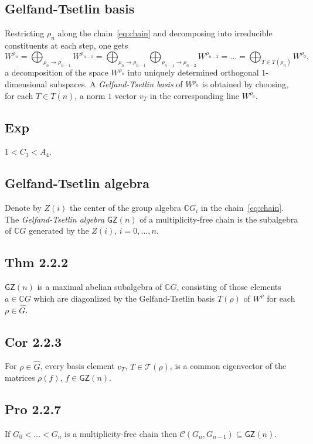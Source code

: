 \documentclass[a4paper]{amsart}
\newcommand{\C}{\mathbb{C}}
\newcommand{\CC}{\mathcal{C}}
\newcommand{\TT}{\mathcal{T}}
\newcommand{\GZ}{\mathsf{GZ}}
\begin{document}
\subsection{Gelfand-Tsetlin basis}

Restricting $\rho_n$ along the chain~\eqref{eq:chain} and decomposing into irreducible
constituents at each step, one gets
\[
W^{\rho_n} = \bigoplus_{\rho_n\to \rho_{n-1}} W^{\rho_{n-1}}
= \bigoplus_{\rho_n\to \rho_{n-1}} \bigoplus_{\rho_{n-1} \to \rho_{n-2}} W^{\rho_{n-2}}
= \dots
= \bigoplus_{T\in T(\rho_n)} W^{\rho_0},
\]
a decomposition of the space $W^{\rho_n}$ into uniquely determined
orthogonal $1$-dimensional subspaces.  A \emph{Gelfand-Tsetlin basis}
of $W^{\rho_n}$ is obtained by choosing, for each $T \in T(n)$, a norm
$1$ vector $v_T$ in the corresponding line $W^{\rho_0}$.

\subsection{Exp} $1 < C_3 < A_4$.

\subsection{Gelfand-Tsetlin algebra}

Denote by $Z(i)$ the center of the group algebra $\C G_i$ in the
chain~\eqref{eq:chain}.  The \emph{Gelfand-Tsetlin algebra} $\GZ(n)$ of a
multiplicity-free chain is the subalgebra of $\C G$ generated by the
$Z(i)$, $i = 0, \dots, n$.

\subsection{Thm 2.2.2}
$\GZ(n)$ is a maximal abelian subalgebra of $\C G$,
consisting of those elements $a \in \C G$ which
are diagonlized by the Gelfand-Tsetlin basis $T(\rho)$ of
$W^{\rho}$ for each $\rho \in \hat{G}$.

\subsection{Cor 2.2.3}
For $\rho \in \hat{G}$, every basis element $v_T$, $T \in \TT(\rho)$,
is a common eigenvector of the matrices $\rho(f)$, $f \in \GZ(n)$.


\subsection{Pro 2.2.7}
If $G_0 < \dots < G_n$ is a multiplicity-free chain then
$\CC(G_n, G_{n-1}) \subseteq \GZ(n)$.
\end{document}

